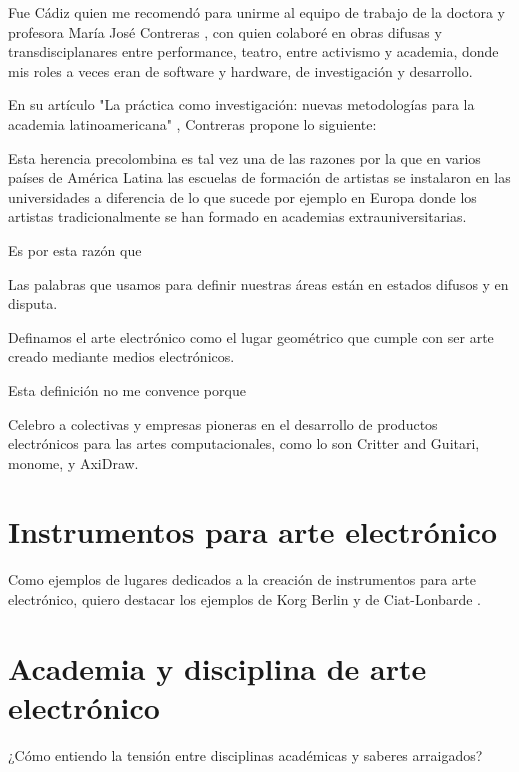 \documentclass{article}
\begin{document}
Fue Cádiz quien me recomendó para unirme al equipo de trabajo de la doctora y profesora María José Contreras \cite{mariaJoseContreras}, con quien colaboré en obras difusas y transdisciplanares entre performance, teatro, entre activismo y academia, donde mis roles a veces eran de software y hardware, de investigación y desarrollo.

En su artículo "La práctica como investigación: nuevas metodologías para la academia latinoamericana" \cite{practicaComoInvestigacion}, Contreras propone lo siguiente:

\begin{displayquote}
    Esta herencia precolombina es tal vez una de las razones por la que en varios países de América Latina las escuelas de formación de artistas se instalaron en las universidades a diferencia de lo que sucede por ejemplo en Europa donde los artistas tradicionalmente se han formado en academias extrauniversitarias.
\end{displayquote}



Es por esta razón que 

Las palabras que usamos para definir nuestras áreas están en estados difusos y en disputa.

Definamos el arte electrónico como el lugar geométrico que cumple con ser arte creado mediante medios electrónicos.

Esta definición no me convence porque 

Celebro a colectivas y empresas pioneras en el desarrollo de productos electrónicos para las artes computacionales, como lo son Critter and Guitari, monome, y AxiDraw.

\clearpage

\section{Instrumentos para arte electrónico}

Como ejemplos de lugares dedicados a la creación de instrumentos para arte electrónico, quiero destacar los ejemplos de Korg Berlin \cite{korgBerlin} y de Ciat-Lonbarde \cite{ciatLonbarde}.

\clearpage

\section{Academia y disciplina de arte electrónico}

¿Cómo entiendo la tensión entre disciplinas académicas y saberes arraigados?
\end{document}
